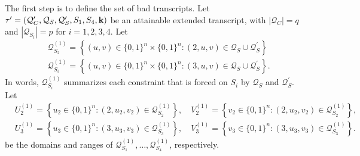 The first step is to define the set of bad transcripts. Let $\tau'=(\mathcal{Q}_{C}',\mathcal{Q}_{S},\mathcal{Q}_{S}',S_1,S_4,\mathbf{k})$ be an attainable extended transcript, with $|\mathcal{Q}_C| = q$ and $|\mathcal{Q}_{S_i}| = p$ for $i = 1, 2,3, 4$. Let
%
$$
\begin{aligned}
&\mathcal{Q}_{S_2}^{(1)}=\left\{(u, v) \in\{0,1\}^{n} \times\{0,1\}^{n}:(2, u, v) \in \mathcal{Q}_{S} \cup \mathcal{Q}_{S}^{\prime}\right\}\\
&\mathcal{Q}_{S_3}^{(1)}=\left\{(u, v) \in\{0,1\}^{n} \times\{0,1\}^{n}:(3, u, v) \in \mathcal{Q}_{S} \cup \mathcal{Q}_{S}^{\prime}\right\}.
\end{aligned}
$$
%
In words, $\mathcal{Q}_{S_{i}}^{(1)}$ summarizes each constraint that is forced on $S_{i}$ by $\mathcal{Q}_{S}$ and $\mathcal{Q}_{S}^{\prime}$. Let        {\small
%
$$
\begin{aligned}
&U_2^{(1)}=\left\{u_2 \in\{0,1\}^{n}:\left(2, u_2, v_2\right) \in \mathcal{Q}_{S_2}^{(1)}\right\}, \quad V_2^{(1)}=\left\{v_2 \in\{0,1\}^{n}:\left(2, u_2, v_2\right) \in \mathcal{Q}_{S_2}^{(1)}\right\},\\
&U_3^{(1)}=\left\{u_3 \in\{0,1\}^{n}:\left(3, u_3, v_3\right) \in \mathcal{Q}_{S_3}^{(1)}\right\}, \quad V_3^{(1)}=\left\{v_3 \in\{0,1\}^{n}:\left(3, u_3, v_3\right) \in \mathcal{Q}_{S_3}^{(1)}\right\}.
\end{aligned}
$$
}%
%
be the domains and ranges of $\mathcal{Q}_{S_{1}}^{(1)},\ldots,\mathcal{Q}_{S_{4}}^{(1)}$, respectively.




